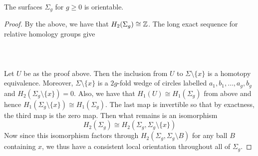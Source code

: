 \documentclass[a4paper]{article}
\begin{document}
\begin{crl}{}{} The surfaces $\Sigma_g$ for $g\geq 0$ is orientable. \tcbline
\begin{proof}
By the above, we have that $H_2(\Sigma_g)\cong\mathbb{Z}$. The long exact sequence for relative homology groups give \\~\\
\\~\\
Let $U$ be as the proof above. Then the inclusion from $U$ to $\Sigma\setminus\{x\}$ is a homotopy equivalence. Moreover, $\Sigma\setminus\{x\}$ is a $2g$-fold wedge of circles labelled $a_1,b_1,\dots,a_g,b_g$ and $H_2(\Sigma_g\setminus\{x\})=0$. Also, we have that $H_1(U)\cong H_1(\Sigma_g)$ from above and hence $H_1(\Sigma_g\setminus\{x\})\cong H_1(\Sigma_g)$. The last map is invertible so that by exactness, the third map is the zero map. Then what remains is an isomorphism $$H_2(\Sigma_g)\cong H_2(\Sigma_g,\Sigma_g\setminus\{x\})$$ Now since this isomorphism factors through $H_2(\Sigma_g,\Sigma_g\setminus B)$ for any ball $B$ containing $x$, we thus have a consistent local orientation throughout all of $\Sigma_g$. 
\end{proof}
\end{crl}
\end{document}
